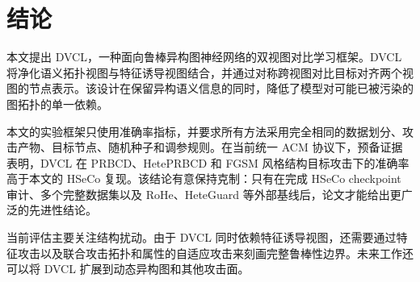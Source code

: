 \section{结论}
\label{sec:conclusion-zh}

本文提出 DVCL，一种面向鲁棒异构图神经网络的双视图对比学习框架。DVCL 将净化语义拓扑视图与特征诱导视图结合，并通过对称跨视图对比目标对齐两个视图的节点表示。该设计在保留异构语义信息的同时，降低了模型对可能已被污染的图拓扑的单一依赖。

本文的实验框架只使用准确率指标，并要求所有方法采用完全相同的数据划分、攻击产物、目标节点、随机种子和调参规则。在当前统一 ACM 协议下，预备证据表明，DVCL 在 PRBCD、HetePRBCD 和 FGSM 风格结构目标攻击下的准确率高于本文的 HSeCo 复现。该结论有意保持克制：只有在完成 HSeCo checkpoint 审计、多个完整数据集以及 RoHe、HeteGuard 等外部基线后，论文才能给出更广泛的先进性结论。

当前评估主要关注结构扰动。由于 DVCL 同时依赖特征诱导视图，还需要通过特征攻击以及联合攻击拓扑和属性的自适应攻击来刻画完整鲁棒性边界。未来工作还可以将 DVCL 扩展到动态异构图和其他攻击面。
